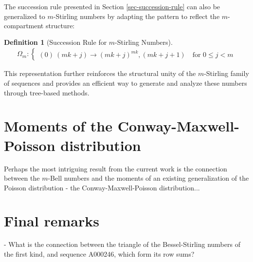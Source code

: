 \documentclass[a4paper]{amsart}
\newtheorem{definition}[theorem]{Definition}
\begin{document}
The succession rule presented in Section \ref{sec-succession-rule} can also be generalized to $m$-Stirling numbers by adapting the pattern to reflect the $m$-compartment structure:
\begin{definition}[Succession Rule for $m$-Stirling Numbers]
\begin{align}
\Omega_m: \begin{cases}
(0) \
(mk+j) \to (mk+j)^{mk} , (mk+j+1) \quad \text{for } 0 \leq j < m
\end{cases}
\end{align}
\end{definition}
This representation further reinforces the structural unity of the $m$-Stirling family of sequences and provides an efficient way to generate and analyze these numbers through tree-based methods.

\section{Moments of the Conway-Maxwell-Poisson distribution}\label{sec-cmp}

Perhaps the most intriguing result from the current work is the connection between the $m$-Bell numbers and the moments of an existing generalization of the Poisson distribution - the Conway-Maxwell-Poisson distribution...

\section{Final remarks}\label{sec-final-remarks}
- What is the connection between the triangle of the Bessel-Stirling numbers of the first kind, and sequence A000246, which form its row sums?

\printbibliography

\pagebreak
\end{document}
